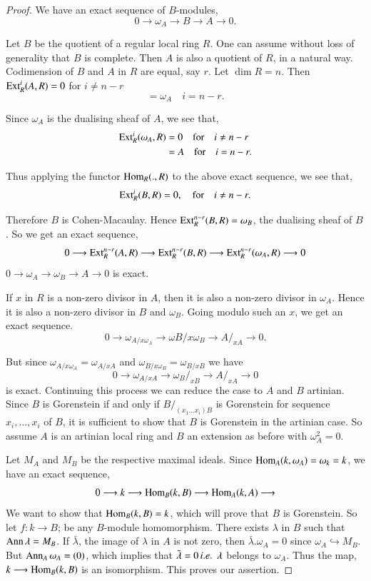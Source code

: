 \begin{proof}
We have an exact sequence of $B$-modules,
$$
0\longrightarrow\omega_A\longrightarrow B\longrightarrow
A\longrightarrow 0.
$$

Let $B$ be the quotient of a regular local ring $R$. One can assume
without loss of generality that $B$ is complete. Then $A$ is also a
quotient of $R$,  in a natural way. Codimension of $B$ and $A$ in $R$
are equal, say $r$. Let $\dim R=n$. Then $\operatorname{Ext}_R^i(A,R)=0$ for $i\neq
n-r$ 
$$
=\omega_A\quad i=n-r.
$$

Since $\omega_A$ is the dualising sheaf of $A$, we see that,
\begin{align*}
\operatorname{Ext}_R^i(\omega_A,R) &= 0\quad\text{for}\quad i\neq n-r\\
&= A\quad\text{for}\quad i=n-r. 
\end{align*}

Thus applying the functor $\operatorname{Hom}_R(.,R)$ to the above exact sequence,
we see that,
$$
\operatorname{Ext}_R^i(B,R)=0,\quad\text{for}\quad i\neq n-r.
$$

Therefore $B$ is Cohen-Macaulay. Hence $\operatorname{Ext}_R^{n-r}(B,R)=\omega_B$,
the dualising sheaf of $B$. So we get an exact sequence, 
$$
0\longrightarrow\operatorname{Ext}_R^{n-r}(A,R)\longrightarrow\operatorname{Ext}_R^{n-r}(B,R)
\longrightarrow\operatorname{Ext}_R^{n-r}(\omega_A,R)\longrightarrow 0
$$
\ie\pageoriginale $0\longrightarrow\omega_A\longrightarrow\omega_B
\longrightarrow A \longrightarrow 0$ is exact.

\noindent If $x$ in $R$ is a non-zero divisor in $A$, then it is also
a non-zero divisor in $\omega_A$. Hence it is also a non-zero divisor
in $B$ and $\omega_B$. Going modulo such an $x$, we get an exact
sequence.
$$
0\longrightarrow\omega_{A/x\omega_A}\longrightarrow
\omega{B/x\omega_B}\longrightarrow A/_{xA}\longrightarrow 0.
$$

But since $\omega_{A/x\omega_A}=\omega_{A/x A}$ and
$\omega_{B/x\omega_B}=\omega_{B/xB}$ we have 
$$
0\longrightarrow\omega_{A/xA}\longrightarrow\omega_B/_{xB}\longrightarrow
A/_{xA}\longrightarrow 0
$$
is exact. Continuing this process we can reduce the case to $A$ and
$B$ artinian. Since $B$ is Gorenstein if and only if $B/_{(x_1\ldots
x_i)B}$ is Gorenstein for sequence $x_i,\ldots,x_i$ of $B$, it is
sufficient to show that $B$ is Gorenstein in the artinian case. So
assume $A$ is an artinian local ring and $B$ an extension as before
with $\omega_A^2=0$. 

Let $M_A$ and $M_B$ be the respective maximal ideals. Since
$\Hom_A(k,\break\omega_A)= \omega_k=k$, we have an exact sequence,
$$
0\longrightarrow k\longrightarrow\operatorname{Hom}_B(k,B)\longrightarrow
\operatorname{Hom}_A(k,A) \longrightarrow
$$
We want to show that $\operatorname{Hom}_B(k,B)=k$, which will prove that $B$ is
Gorenstein. So let $f:k\longrightarrow B$; be any $B$-module
homomorphism. \ie There exists $\lambda$ in $B$ such that $\operatorname{Ann} \lambda
=M_B$. If $\bar{\lambda}$, the image of $\lambda$ in $A$ is not zero,
then $\bar{\lambda}.\omega_A=0$ since $\omega_A\hookrightarrow
M_B$. But $\operatorname{Ann}_A\omega_A=(0)$, which implies that $\bar{\lambda}=0 \,
{i.e.}\kern.3em \,\lambda$ belongs to $\omega_A$. Thus the map, $k\longrightarrow
\operatorname{Hom}_B(k,B)$ is an isomorphism. This proves our assertion.


\end{proof}
